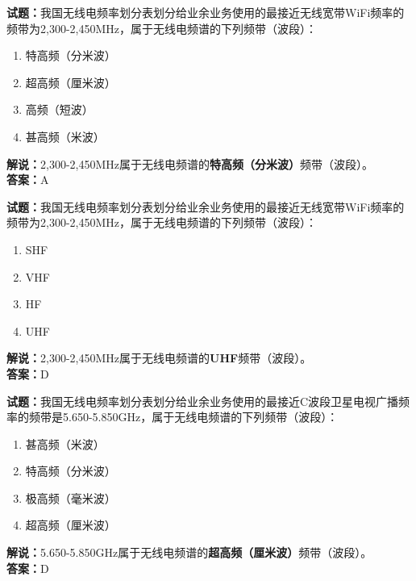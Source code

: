 \documentclass{ctexbook}
\begin{document}
\vspace{\baselineskip}

\noindent\textbf{试题：}我国无线电频率划分表划分给业余业务使用的最接近无线宽带WiFi频率的频带为2,300-2,450\unit{\MHz}，属于无线电频谱的下列频带（波段）：
\begin{enumerate}[leftmargin=3em]
  \item 特高频（分米波）
  \item 超高频（厘米波）
  \item 高频（短波）
  \item 甚高频（米波）
\end{enumerate}
\noindent\textbf{解说：}2,300-2,450\unit{\MHz}属于无线电频谱的\textbf{特高频（分米波）}频带（波段）。\\\noindent\textbf{答案：}A

\vspace{\baselineskip}

\noindent\textbf{试题：}我国无线电频率划分表划分给业余业务使用的最接近无线宽带WiFi频率的频带为2,300-2,450\unit{\MHz}，属于无线电频谱的下列频带（波段）：
\begin{enumerate}[leftmargin=3em]
  \item SHF
  \item VHF
  \item HF
  \item UHF
\end{enumerate}
\noindent\textbf{解说：}2,300-2,450\unit{\MHz}属于无线电频谱的\textbf{UHF}频带（波段）。\\\noindent\textbf{答案：}D

\vspace{\baselineskip}

\noindent\textbf{试题：}我国无线电频率划分表划分给业余业务使用的最接近C波段卫星电视广播频率的频带是5.650-5.850\unit{\GHz}，属于无线电频谱的下列频带（波段）：
\begin{enumerate}[leftmargin=3em]
  \item 甚高频（米波）
  \item 特高频（分米波）
  \item 极高频（毫米波）
  \item 超高频（厘米波）
\end{enumerate}
\noindent\textbf{解说：}5.650-5.850\unit{\GHz}属于无线电频谱的\textbf{超高频（厘米波）}频带（波段）。\\\noindent\textbf{答案：}D

\vspace{\baselineskip}
\end{document}
